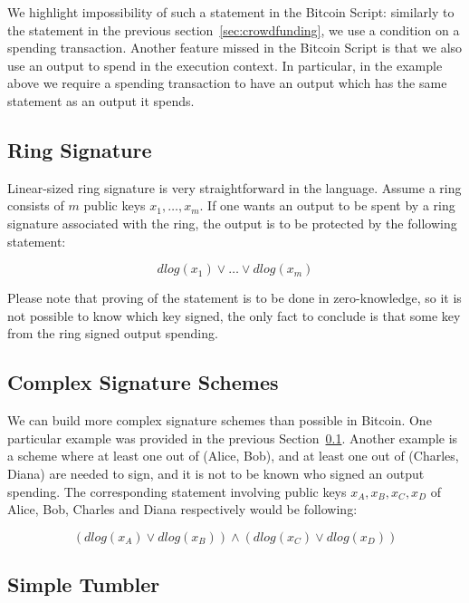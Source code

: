 \documentclass[11pt]{llncs}
\newcommand{\authnote}[2]{\marginpar{\parbox{\marginparwidth}{\tiny %
  \textsf{#1 {\textcolor{blue}{notes: #2}}}}}%
  \textcolor{blue}{\textbf{\dag}}}
\newcommand{\authnote}[2]{
  \textsf{#1 \textcolor{blue}{: #2}}}
\newcommand{\authnote}[2]{}
\newcommand{\knote}[1]{{\authnote{\textcolor{green}{kushti notes}}{#1}}}
\begin{document}
We highlight impossibility of such a statement in the Bitcoin Script: similarly to the statement in the previous section~\ref{sec:crowdfunding}, we use a condition on a spending transaction. Another feature missed in the Bitcoin Script is that we also use an output to spend in the execution context. In particular, in the example above we require a spending transaction to have an output which has the same statement as an output it spends. 

\subsection{Ring Signature}
\label{sec:ring}

Linear-sized ring signature is very straightforward in the language. Assume a ring consists of $m$ public keys $x_1, \dots, x_m$. If one wants an output to be spent by a ring signature associated with the ring, the output is to be protected by the following statement:

$$dlog(x_1) \lor \dots \lor dlog(x_m)$$  

Please note that proving of the statement is to be done in zero-knowledge, so it is not possible to know which key signed, the only fact to conclude is that some key from the ring signed output spending. 

\subsection{Complex Signature Schemes}

We can build more complex signature schemes than possible in Bitcoin. One particular example was provided in the previous Section~\ref{sec:ring}. Another example is a scheme where at least one out of (Alice, Bob), and at least one out of (Charles, Diana) are needed to sign, and it is not to be known who signed an output spending. The corresponding statement involving public keys $x_A, x_B, x_C, x_D$ of Alice, Bob, Charles and Diana respectively would be following:

$$(dlog(x_A) \lor dlog(x_B)) \land (dlog(x_C) \lor dlog(x_D))$$

\subsection{Simple Tumbler}
\label{sec:tumbler}

\knote{does the example makes sense? check other tumbler papers. also, update the scripts, now approach is more generic than using tx.outbytes}
\end{document}
